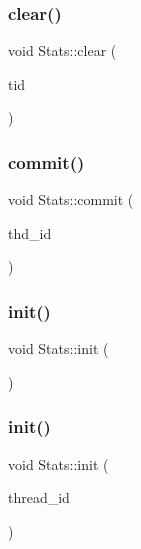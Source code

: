\mbox{\label{classStats_aa0521a06895775f85fc72df31e93a472}} 
\subsubsection{\texorpdfstring{clear()}{clear()}}
{\footnotesize\ttfamily void Stats\+::clear (\begin{DoxyParamCaption}\item[{uint64\+\_\+t}]{tid }\end{DoxyParamCaption})}

\mbox{\label{classStats_adc8454cb34173a4cef73c455e0cbfbee}} 
\subsubsection{\texorpdfstring{commit()}{commit()}}
{\footnotesize\ttfamily void Stats\+::commit (\begin{DoxyParamCaption}\item[{uint64\+\_\+t}]{thd\+\_\+id }\end{DoxyParamCaption})}

\mbox{\label{classStats_a18ae30cf88fc793d1e2352215d60200f}} 
\subsubsection{\texorpdfstring{init()}{init()}\hspace{0.1cm}{\footnotesize\ttfamily [1/2]}}
{\footnotesize\ttfamily void Stats\+::init (\begin{DoxyParamCaption}{ }\end{DoxyParamCaption})}

\mbox{\label{classStats_a59e70126dea691f97d798b60ef519ed2}} 
\subsubsection{\texorpdfstring{init()}{init()}\hspace{0.1cm}{\footnotesize\ttfamily [2/2]}}
{\footnotesize\ttfamily void Stats\+::init (\begin{DoxyParamCaption}\item[{uint64\+\_\+t}]{thread\+\_\+id }\end{DoxyParamCaption})}


